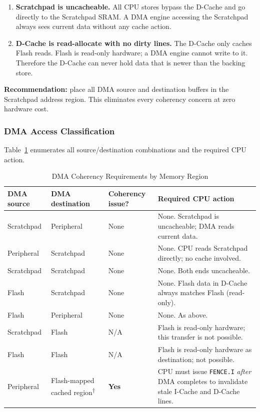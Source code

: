 \begin{enumerate}
  \item \textbf{Scratchpad is uncacheable.}
    All CPU stores bypass the D-Cache and go directly to the Scratchpad
    SRAM.
    A DMA engine accessing the Scratchpad always sees current data without
    any cache action.
  \item \textbf{D-Cache is read-allocate with no dirty lines.}
    The D-Cache only caches Flash reads.
    Flash is read-only hardware; a DMA engine cannot write to it.
    Therefore the D-Cache can never hold data that is newer than the
    backing store.
\end{enumerate}

\textbf{Recommendation:} place all DMA source and destination buffers in
the Scratchpad address region.
This eliminates every coherency concern at zero hardware cost.

\subsubsection{DMA Access Classification}

Table~\ref{tab:asDmaCoh} enumerates all source/destination combinations
and the required CPU action.

\begin{table}[H]
\caption{DMA Coherency Requirements by Memory Region}
\label{tab:asDmaCoh}
\centering
\begin{tabularx}{\textwidth}{|l |X |X |X|}
  \hline
  DMA source & DMA destination & Coherency issue? & Required CPU action \\
  \hline
  \hline
  Scratchpad & Peripheral & None &
    None. Scratchpad is uncacheable; DMA reads current data. \\
  \hline
  Peripheral & Scratchpad & None &
    None. CPU reads Scratchpad directly; no cache involved. \\
  \hline
  Scratchpad & Scratchpad & None &
    None. Both ends uncacheable. \\
  \hline
  Flash      & Scratchpad & None &
    None. Flash data in D-Cache always matches Flash (read-only). \\
  \hline
  Flash      & Peripheral & None &
    None. As above. \\
  \hline
  Scratchpad & Flash      & N/A  &
    Flash is read-only hardware; this transfer is not possible. \\
  \hline
  Flash      & Flash      & N/A  &
    Flash is read-only hardware as destination; not possible. \\
  \hline
  Peripheral & Flash-mapped cached region\textsuperscript{$\dagger$}
             & \textbf{Yes} &
    CPU must issue \texttt{FENCE.I} \emph{after} DMA completes to
    invalidate stale I-Cache and D-Cache lines. \\
  \hline
\end{tabularx}
\end{table}

